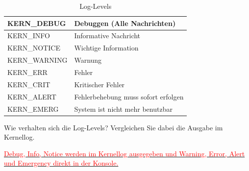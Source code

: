\begin{table}[h!]
   \begin{center}
   \begin{tabular}{| l | l |} \hline
   KERN\_DEBUG   & Debuggen (Alle Nachrichten) \\ \hline
   KERN\_INFO    & Informative Nachricht \\ \hline
   KERN\_NOTICE  & Wichtige Information \\ \hline
   KERN\_WARNING & Warnung \\ \hline
   KERN\_ERR     & Fehler \\ \hline
   KERN\_CRIT    & Kritischer Fehler \\ \hline
   KERN\_ALERT   & Fehlerbehebung muss sofort erfolgen \\ \hline
   KERN\_EMERG   & System ist nicht mehr benutzbar \\ \hline
   \end{tabular}
   \caption{Log-Levels}
   \label{tab:loglevel2}
   \end{center}
\end{table}


Wie verhalten sich die Log-Levels? Vergleichen Sie dabei die Ausgabe im Kernellog.

\underline{\textcolor{red}{Debug, Info, Notice werden im Kernellog ausgegeben und Warning, Error, Alert}\hspace{0.04\textwidth}} \\
\underline{\textcolor{red}{und Emergency direkt in der Konsole.}\hspace{0.498\textwidth}}
